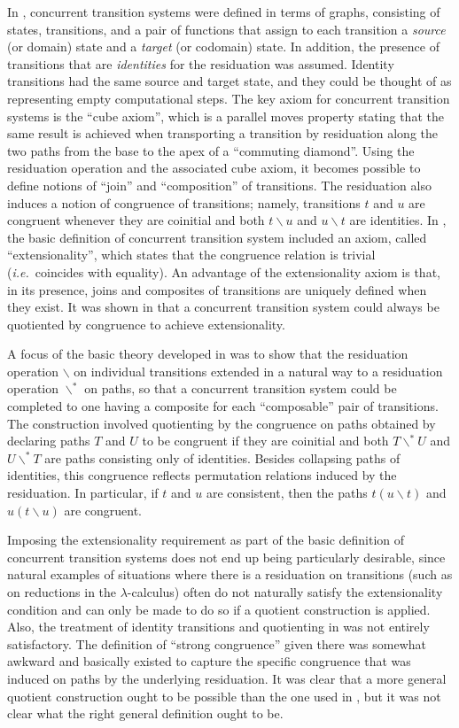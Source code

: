 \documentclass[11pt,notitlepage,a4paper]{report}
\newcommand\after{\backslash}
\begin{document}
In \cite{cts}, concurrent transition systems were defined in terms of graphs, consisting
of states, transitions, and a pair of functions that assign to each transition a {\em source}
(or domain) state and a {\em target} (or codomain) state.  In addition, the presence of
transitions that are {\em identities} for the residuation was assumed.
Identity transitions had the same source and target state, and they could be thought of as
representing empty computational steps.
The key axiom for concurrent transition systems is the ``cube axiom'', which
is a parallel moves property stating that the same result is achieved when transporting a
transition by residuation along the two paths from the base to the apex of a ``commuting diamond''.
Using the residuation operation and the associated cube axiom, it becomes possible to define
notions of ``join'' and ``composition'' of transitions.
The residuation also induces a notion of congruence of transitions; namely, transitions
$t$ and $u$ are congruent whenever they are coinitial and both $t \after u$ and $u \after t$
are identities.
In \cite{cts}, the basic definition of concurrent transition system included an axiom,
called ``extensionality'', which states that the congruence relation is trivial
({\em i.e.}~coincides with equality).  An advantage of the extensionality axiom is that,
in its presence, joins and composites of transitions are uniquely defined when they exist.
It was shown in \cite{cts} that a concurrent transition system could always be quotiented
by congruence to achieve extensionality.

A focus of the basic theory developed in \cite{cts} was to show that the residuation
operation $\after$ on individual transitions extended in a natural way to a residuation
operation $\after^\ast$ on paths, so that a concurrent transition system could be completed
to one having a composite for each ``composable'' pair of transitions.  The construction
involved quotienting by the congruence on paths obtained by declaring paths $T$ and $U$
to be congruent if they are coinitial and both $T \after^\ast U$ and $U \after^\ast T$
are paths consisting only of identities.  Besides collapsing paths of identities, this
congruence reflects permutation relations induced by the residuation.  In particular,
if $t$ and $u$ are consistent, then the paths $t (u \after t)$ and $u (t \after u)$
are congruent.

Imposing the extensionality requirement as part of the basic definition of concurrent
transition systems does not end up being particularly desirable, since natural examples
of situations where there is a residuation on transitions (such as on reductions in
the $\lambda$-calculus) often do not naturally satisfy the extensionality condition
and can only be made to do so if a quotient construction is applied.
Also, the treatment of identity transitions and quotienting in \cite{cts} was not entirely
satisfactory.  The definition of ``strong congruence'' given there was somewhat awkward
and basically existed to capture the specific congruence that was induced on paths
by the underlying residuation.  It was clear that a more general quotient construction
ought to be possible than the one used in \cite{cts}, but it was not clear what the right
general definition ought to be.
\end{document}

